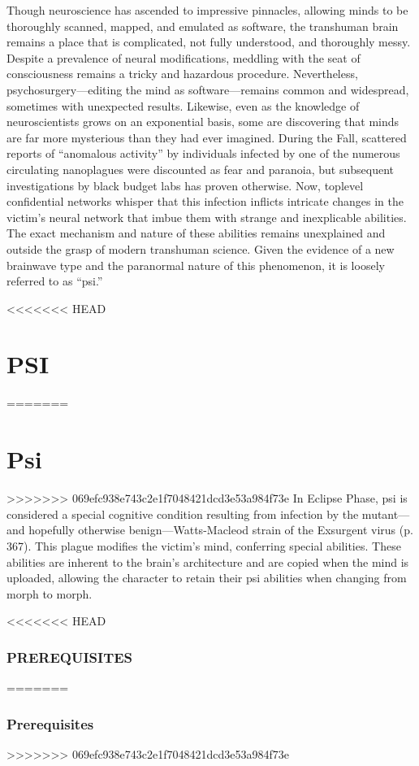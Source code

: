 \newpage

Though neuroscience has ascended to impressive
pinnacles, allowing minds to be thoroughly scanned,
mapped, and emulated as software, the transhuman
brain remains a place that is complicated, not fully
understood, and thoroughly messy. Despite a prevalence
of neural modifications, meddling with the seat
of consciousness remains a tricky and hazardous
procedure. Nevertheless, psychosurgery—editing the
mind as software—remains common and widespread,
sometimes with unexpected results.
Likewise, even as the knowledge of neuroscientists
grows on an exponential basis, some are discovering
that minds are far more mysterious than they had ever
imagined. During the Fall, scattered reports of “anomalous
activity” by individuals infected by one of the
numerous circulating nanoplagues were discounted
as fear and paranoia, but subsequent investigations
by black budget labs has proven otherwise. Now, toplevel
confidential networks whisper that this infection
inflicts intricate changes in the victim’s neural network
that imbue them with strange and inexplicable abilities.
The exact mechanism and nature of these abilities
remains unexplained and outside the grasp of modern
transhuman science. Given the evidence of a new
brainwave type and the paranormal nature of this
phenomenon, it is loosely referred to as “psi.”

<<<<<<< HEAD
\section{PSI}
=======
\section{Psi}
>>>>>>> 069efc938e743c2e1f7048421dcd3e53a984f73e
In Eclipse Phase, psi is considered a special cognitive
condition resulting from infection by the mutant—and
hopefully otherwise benign—Watts-Macleod strain
of the Exsurgent virus (p. 367). This plague modifies
the victim’s mind, conferring special abilities. These
abilities are inherent to the brain’s architecture and
are copied when the mind is uploaded, allowing the
character to retain their psi abilities when changing
from morph to morph.

<<<<<<< HEAD
\subsubsection{PREREQUISITES}
=======
\subsubsection{Prerequisites}
>>>>>>> 069efc938e743c2e1f7048421dcd3e53a984f73e


